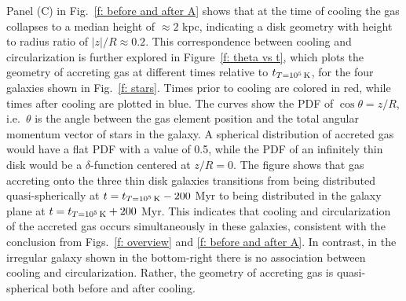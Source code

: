 \documentclass[fleqn,usenatbib]{mnras}
\newcommand{\tcon}{t_{T=10^5\,{\rm K}}}
\begin{document}
Panel (C) in Fig.~\ref{f: before and after A} shows that at the time of cooling the gas collapses to a median height of $\approx 2$ kpc, indicating a disk geometry with height to radius ratio of $\vert z\vert/R\approx0.2$. This correspondence between cooling and circularization is further explored in Figure~\ref{f: theta vs t}, which plots the geometry of accreting gas at different times relative to $\tcon$, for the four galaxies shown in Fig.~\ref{f: stars}.
Times prior to cooling are colored in red, while times after cooling are plotted in blue.
The curves show the PDF of $\cos \theta = z/R$, i.e.\ $\theta$ is the angle between the gas element position and the total angular momentum vector of stars in the galaxy.
A spherical distribution of accreted gas would have a flat PDF with a value of 0.5, while 
the PDF of an infinitely thin disk would be a $\delta$-function centered at $z/R = 0$.
The figure shows that gas accreting onto the three thin disk galaxies transitions from being distributed quasi-spherically at $t = \tcon-200$ Myr to being distributed in the galaxy plane at $t = \tcon+200$ Myr.
This indicates that cooling and circularization of the accreted gas occurs simultaneously in these galaxies, consistent with the conclusion from Figs.~\ref{f: overview} and \ref{f: before and after A}. In contrast, in the irregular galaxy shown in the bottom-right there is no association between cooling and circularization. Rather, the geometry of accreting gas is quasi-spherical both before and after cooling. 

\end{document}

